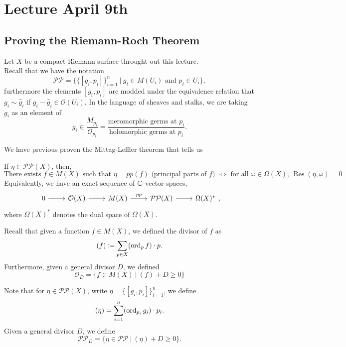 \documentclass{article}
\begin{document}
{\newpage
\section{Lecture April 9th}

\subsection{Proving the Riemann-Roch Theorem}
 Let $X$ be a compact Riemann surface throught out this lecture.  \\
 
Recall that we have the notation
\[\mathcal{P} \mathcal{P} = \{\{[g_i, p_i]\}_{i = 1}^n\ |\ g_i \in M(U_i) \text{ and } p_i \in U_i\},\]
furthermore the elements $[g_i, p_i]$ are modded under the equivalence relation that $g_i \sim \hat{g}_i$ if $g_i - \hat{g}_i \in \mathcal{O}(U_i)$. In the language of sheaves and stalks, we are taking $g_i$ as an element of 
\[g_i \in \frac{M_{p_i}}{\mathcal{O}_{p_i}} = \frac{\text{meromorphic germs at $p_i$}}{\text{holomorphic germs at $p_i$}}.\]

We have previous proven the Mittag-Leffler theorem that tells us
\begin{theorem}
If $\eta \in \mathcal{P} \mathcal{P}(X)$, then,
\[\text{There exists $f \in M(X)$ such that $\eta = pp(f)$ (principal parts of $f$) $\iff$ for all $\omega \in \Omega(X)$, $\operatorname{Res}(\eta, \omega) = 0$}.\]
Equivalently, we have an exact sequence of $\mathbb{C}$-vector spaces,
\[\begin{tikzcd}
	0 & {\mathcal{O}(X)} & {M(X)} & {\mathcal{P}\mathcal{P}(X)} & {\Omega(X)^*}
	\arrow[from=1-1, to=1-2]
	\arrow[from=1-2, to=1-3]
	\arrow["pp", from=1-3, to=1-4]
	\arrow[from=1-4, to=1-5]
\end{tikzcd},\]
where $\Omega(X)^*$ denotes the dual space of $\Omega(X)$.
\end{theorem}

Recall that given a function $f \in M(X)$, we defined the divisor of $f$ as
\[(f) \coloneqq \sum_{p \in X} (\operatorname{ord}_p f) \cdot p.\]
Furthermore, given a general divisor $D$, we defined
\[\mathcal{O}_D = \{f \in M(X)\ |\ (f) + D \geq 0\}\]

\begin{definition}
    Note that for $\eta \in \mathcal{P} \mathcal{P}(X)$, write $\eta = \{[g_i, p_i]\}_{i = 1}^n$, we define
    \[(\eta) = \sum_{i = 1}^n (\operatorname{ord}_{p_i} g_i) \cdot p_i.\]
    Given a general divisor $D$, we define
    \[\mathcal{P}\mathcal{P}_D = \{\eta \in \mathcal{P} \mathcal{P}\ |\ (\eta) + D \geq 0\}. \]
\end{definition}

}
\end{document}
